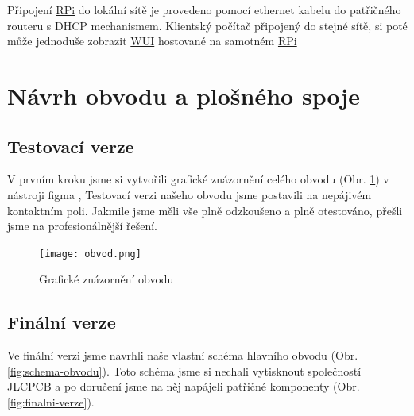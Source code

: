 \documentclass[czech,12pt,a4paper]{article}
\begin{document}
Připojení \underline{\ac{RPi}} do lokální sítě je provedeno pomocí ethernet kabelu do patřičného routeru s \ac{DHCP} mechanismem. Klientský počítač připojený do stejné sítě, si poté může jednoduše zobrazit \underline{\ac{WUI}} hostované na samotném \underline{\ac{RPi}}

\clearpage

\section{Návrh obvodu a plošného spoje} \label{secPCB}

\subsection{Testovací verze}

V prvním kroku jsme si vytvořili grafické znázornění celého obvodu (Obr. \ref{fig:graficke-znazorneni-obvodu}) v nástroji figma \cite{figma}, Testovací verzi našeho obvodu jsme postavili na nepájivém kontaktním poli. Jakmile jsme měli vše plně odzkoušeno a plně otestováno, přešli jsme na profesionálnější řešení.

\noindent\begin{figure}[h]
	\texttt{[image: obvod.png]}
	\caption{Grafické znázornění obvodu}
	\label{fig:graficke-znazorneni-obvodu}
\end{figure}

\clearpage

\subsection{Finální verze}

Ve finální verzi jsme navrhli naše vlastní schéma hlavního obvodu (Obr. \ref{fig:schema-obvodu}). Toto schéma jsme si nechali vytisknout společností JLCPCB a po doručení jsme na něj napájeli patřičné komponenty (Obr. \ref{fig:finalni-verze}).
\end{document}
